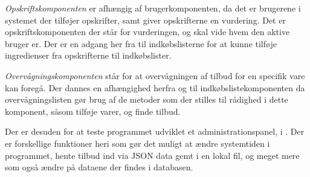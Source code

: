 \textit{Opskriftskomponenten} er afhængig af brugerkomponenten, da det er brugerene i systemet der tilføjer opskrifter, samt giver opskrifterne en vurdering.
Det er opskriftskomponenten der står for vurderingen, og skal vide hvem den aktive bruger er.
Der er en adgang her fra til indkøbslisterne for at kunne tilføje ingredienser fra opskrifterne til indkøbslister.

\textit{Overvågningskomponenten} står for at overvågningen af tilbud for en specifik vare kan foregå.
Der dannes en afhængighed herfra og til indkøbslistekomponenten da overvågningslisten gør brug af de metoder som der stilles til rådighed i dette komponent, såsom tilføje varer, og finde tilbud.

Der er desuden for at teste programmet udviklet et administrationspanel, i . Der er forskellige funktioner heri som gør det muligt at ændre systemtiden i programmet, hente tilbud ind via JSON data gemt i en lokal fil, og meget mere som også ændre på dataene der findes i databasen.


